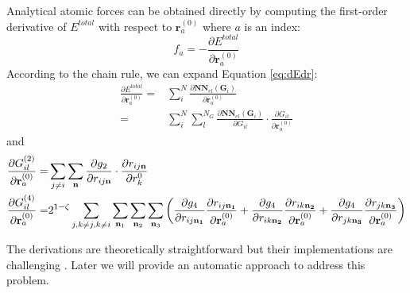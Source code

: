 \documentclass[final,1p,times]{elsarticle}
\begin{document}
Analytical atomic forces can be obtained directly by computing the first-order 
derivative of $E^{total}$ with respect to $\mathbf{r}_{a}^{(0)}$ where $a$ is an 
index:
\begin{equation}
\label{eq:dEdr}
f_a = -\frac{\partial E^{total}}{\partial \mathbf{r}_a^{(0)}}
\end{equation}
According to the chain rule, we can expand Equation \ref{eq:dEdr}:
\begin{align}
\frac{\partial E^{total}}{\partial \mathbf{r}_a^{(0)}} = & \sum_{i}^{N}{
    \frac{
        \partial\mathbf{NN}_{el}(\mathbf{G}_i)}{
        \partial \mathbf{r}_a^{(0)}}} \nonumber \\
= & \sum_{i}^{N}{\sum_{l}^{N_G}{
    \frac{\partial \mathbf{NN}_{el}(\mathbf{G}_i)}{\partial G_{il}}
    \cdot
    \frac{\partial G_{il}}{\partial \mathbf{r}_{a}^{(0)}}
}}
\end{align}
and 
\begin{align}
\frac{\partial G_{il}^{(2)}}{\partial \mathbf{r}_{a}^{(0)}} = & \sum_{j \neq i}{
    \sum_{\mathbf{n}}{
        \frac{\partial g_2}{\partial r_{ij\mathbf{n}}}
        \cdot
        \frac{\partial r_{ij\mathbf{n}}}{\partial r_k^{0}}
    }
} \\
\frac{\partial G_{il}^{(4)}}{\partial \mathbf{r}_{a}^{(0)}} = &
2^{1 - \zeta}\sum_{j, k \neq j, k \neq i}{
    \sum_{\mathbf{n}_1}{\sum_{\mathbf{n}_2}{\sum_{\mathbf{n}_3}{
        \left(
            \frac{\partial g_4}{\partial r_{ij\mathbf{n_1}}}
            \frac{\partial r_{ij\mathbf{n_1}}}{\partial \mathbf{r}_{a}^{(0)}} + 
            \frac{\partial g_4}{\partial r_{ik\mathbf{n_2}}}
            \frac{\partial r_{ik\mathbf{n_2}}}{\partial \mathbf{r}_{a}^{(0)}} + 
            \frac{\partial g_4}{\partial r_{jk\mathbf{n_3}}}
            \frac{\partial r_{jk\mathbf{n_3}}}{\partial \mathbf{r}_{a}^{(0)}}
        \right)
    }}}
}
\end{align}

The derivations are theoretically straightforward but their implementations are 
challenging \cite{AMP}. Later we will provide an automatic approach to address 
this problem.
\end{document}
